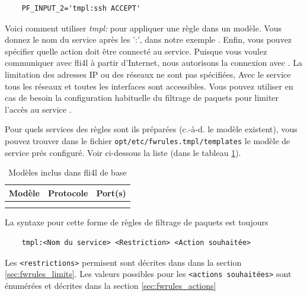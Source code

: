 \begin{example}
\begin{verbatim}
    PF_INPUT_2='tmpl:ssh ACCEPT'
\end{verbatim}
\end{example}

Voici comment utiliser \emph{tmpl:} pour appliquer une règle dans un modèle.
Vous donnez le nom du service après les ':', dans notre exemple .
Enfin, vous pouvez spécifier quelle action doit être connecté au service.
Puisque vous voulez communiquer avec fli4l à partir d'Internet, nous autorisons
la connexion avec . La limitation des adresses IP ou des réseaux
ne sont pas spécifiées, Avec le service  tous les réseaux et toutes
les interfaces sont accessibles. Vous pouvez utiliser en cas de besoin la
configuration habituelle du filtrage de paquets pour limiter l'accès au service
.

Pour quels services des règles sont ils préparées (c.-à-d. le modèle existent),
vous pouvez trouver dans le fichier \verb+opt/etc/fwrules.tmpl/templates+ le
modèle de service prés configuré. Voir ci-dessous la liste (dans le tableau
\ref{tab:fwrules_tmpl}).

\begin{center}
  {\footnotesize
  \begin{longtable}{|lll|}
     \hline
     {\textbf{Modèle}} & {\textbf{Protocole}} & {\textbf{Port(s)}} \\
     \hline\hline
     \endhead
      \\
     \hline
     \caption{Modèles inclus dans fli4l de base}
     \label{tab:fwrules_tmpl}
  \end{longtable}}
\end{center}

La syntaxe pour cette forme de règles de filtrage de paquets est toujours

\begin{example}
\begin{verbatim}
    tmpl:<Nom du service> <Restriction> <Action souhaitée>
\end{verbatim}
\end{example}

Les \verb+<restrictions>+ permisent sont décrites dans dans la section
\ref{sec:fwrules_limits}. Les valeurs possibles pour les \verb+<actions souhaitées>+
sont énumérées et décrites dans la section \ref{sec:fwrules_actions}

